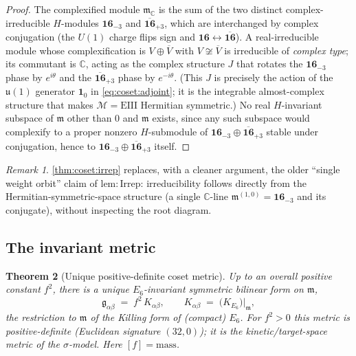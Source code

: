 \documentclass[11pt]{article}
\theoremstyle{plain}
\newtheorem{theorem}{Theorem}[section]
\theoremstyle{definition}
\theoremstyle{remark}
\newtheorem{remark}[theorem]{Remark}
\begin{document}
\begin{proof}
The complexified module $\mathfrak m_{\mathbb C}$ is the sum of the two distinct
complex-irreducible $H$-modules $\mathbf{16}_{-3}$ and
$\overline{\mathbf{16}}_{+3}$, which are interchanged by complex conjugation
(the $U(1)$ charge flips sign and $\mathbf{16}\leftrightarrow\overline{\mathbf{16}}$).
A real-irreducible module whose complexification is $V\oplus\overline V$ with
$V\not\cong\overline V$ is irreducible of \emph{complex type}; its commutant is
$\mathbb C$, acting as the complex structure $J$ that rotates the
$\mathbf{16}_{-3}$ phase by $e^{i\theta}$ and the $\overline{\mathbf{16}}_{+3}$
phase by $e^{-i\theta}$. (This $J$ is precisely the action of the $\mathfrak u(1)$
generator $\mathbf 1_{0}$ in \eqref{eq:coset:adjoint}; it is the integrable
almost-complex structure that makes $\mathcal M=\mathrm{EIII}$ Hermitian
symmetric.) No real $H$-invariant subspace of $\mathfrak m$ other than $0$ and
$\mathfrak m$ exists, since any such subspace would complexify to a proper
nonzero $H$-submodule of $\mathbf{16}_{-3}\oplus\overline{\mathbf{16}}_{+3}$
stable under conjugation, hence to $\mathbf{16}_{-3}\oplus\overline{\mathbf{16}}_{+3}$
itself.
\end{proof}

\begin{remark}\label{rem:coset:hermitian}
\autoref{thm:coset:irrep} replaces, with a cleaner argument, the older
``single weight orbit'' claim of $\mathrm{lem}{:}\mathrm{Irrep}$: irreducibility
follows directly from the Hermitian-symmetric-space structure (a single
$\mathbb C$-line $\mathfrak m^{(1,0)} = \mathbf{16}_{-3}$ and its conjugate),
without inspecting the root diagram.
\end{remark}

\subsection{The invariant metric}
\label{sec:coset:metric}

\begin{theorem}[Unique positive-definite coset metric]\label{thm:coset:metric}
\label{thm:uniqueMetric}
\label{thm:InvariantMetric}
Up to an overall positive constant $f^{2}$, there is a unique $E_{6}$-invariant
symmetric bilinear form on $\mathfrak m$,
\begin{equation}\label{eq:coset:metric}
  \mathfrak g_{\alpha\beta} \;=\; f^{2}\,K_{\alpha\beta},
  \qquad
  K_{\alpha\beta} \;=\; \bigl(K_{E_{6}}\bigr)\big|_{\mathfrak m},
\end{equation}
the restriction to $\mathfrak m$ of the Killing form of (compact) $E_{6}$. For
$f^{2}>0$ this metric is positive-definite (Euclidean signature
$(32,0)$); it is the kinetic/target-space metric of the $\sigma$-model. Here
$[f] = \text{mass}$.
\end{theorem}
\end{document}
